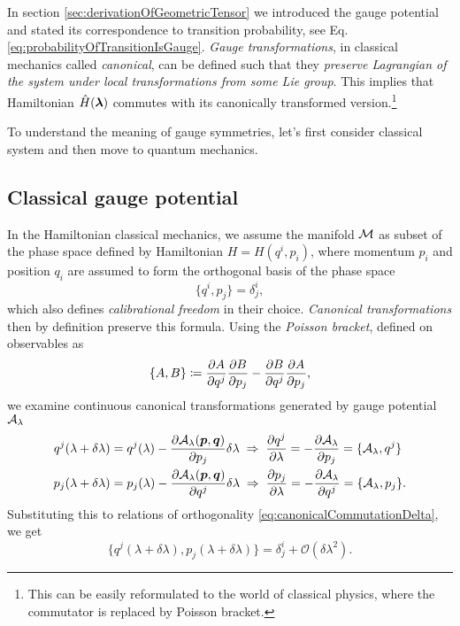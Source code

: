 In section \ref{sec:derivationOfGeometricTensor} we introduced the gauge potential and stated its correspondence to transition probability, see Eq. \ref{eq:probabilityOfTransitionIsGauge}.
\emph{Gauge transformations}, in classical mechanics called \emph{canonical}, can be defined such that they \emph{preserve Lagrangian of the system under local transformations from some Lie group}. This implies that Hamiltonian $\hat{H}({\bm\lambda})$ commutes with its canonically transformed version.\footnote{This can be easily reformulated to the world of classical physics, where the commutator is replaced by Poisson bracket.}

To understand the meaning of gauge symmetries, let's first consider classical system and then move to quantum mechanics.




\subsection{Classical gauge potential}
In the Hamiltonian classical mechanics, we assume the manifold $\mathcal{M}$ as subset of the phase space defined by Hamiltonian $H=H(q^i,p_i)$, where momentum $p_i$ and position $q_i$ are assumed to form the orthogonal basis of the phase space
\begin{equation}
    \{q^i,p_j\}=\delta^i_j,
    \label{eq:canonicalCommutationDelta}
\end{equation}
which also defines \emph{calibrational freedom} in their choice. \emph{Canonical transformations} then by definition preserve this formula. Using the \emph{Poisson bracket}, defined on observables as
\begin{equation}
    \{A,B\}\coloneqq \frac{\partial A}{\partial q^j}\frac{\partial B}{\partial p_j}-\frac{\partial B}{\partial q^j}\frac{\partial A}{\partial p_j},
\end{equation}
we examine continuous canonical transformations generated by gauge potential $\mathcal{A}_\lambda$
\begin{align}
        q^j(\lambda+\delta\lambda)&=q^j(\lambda)-\frac{\partial \mathcal{A}_\lambda(\bm{p},\bm{q})}{\partial p_j}\delta\lambda \;\Rightarrow\; \frac{\partial q^j}{\partial \lambda}=-\frac{\partial \mathcal{A}_\lambda}{\partial p_j}=\{\mathcal{A}_\lambda,q^j\}
        \label{eq:gaugeAsGeneratorOfMotion1}\\
        p_j(\lambda+\delta\lambda)&=p_j(\lambda)-\frac{\partial \mathcal{A}_\lambda(\bm{p},\bm{q})}{\partial q^j}\delta\lambda \;\Rightarrow\; \frac{\partial p_j}{\partial \lambda}=-\frac{\partial \mathcal{A}_\lambda}{\partial q^j}=\{\mathcal{A}_\lambda,p_j\}.
        \label{eq:gaugeAsGeneratorOfMotion2}
\end{align}
Substituting this to relations of orthogonality \ref{eq:canonicalCommutationDelta}, we get
\begin{equation}
    \{q^j(\lambda+\delta\lambda),p_j(\lambda+\delta\lambda)\}=\delta^i_j + \mathcal{O}(\delta\lambda^2).
\end{equation}
 

